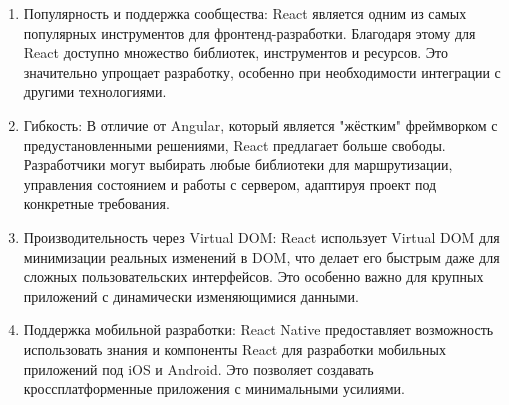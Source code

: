 \begin{enumerate}
	\item Популярность и поддержка сообщества: React является одним из самых популярных инструментов для фронтенд-разработки. Благодаря этому для React доступно множество библиотек, инструментов и ресурсов. Это значительно упрощает разработку, особенно при необходимости интеграции с другими технологиями.
	\item Гибкость: В отличие от Angular, который является "жёстким" фреймворком с предустановленными решениями, React предлагает больше свободы. Разработчики могут выбирать любые библиотеки для маршрутизации, управления состоянием и работы с сервером, адаптируя проект под конкретные требования.
	\item Производительность через Virtual DOM: React использует Virtual DOM для минимизации реальных изменений в DOM, что делает его быстрым даже для сложных пользовательских интерфейсов. Это особенно важно для крупных приложений с динамически изменяющимися данными.
	\item Поддержка мобильной разработки: React Native предоставляет возможность использовать знания и компоненты React для разработки мобильных приложений под iOS и Android. Это позволяет создавать кроссплатформенные приложения с минимальными усилиями.
\end{enumerate}
